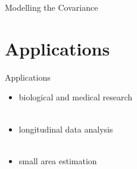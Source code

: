\documentclass[9pt, xelatex]{beamer}
\begin{document}
{\begin{frame}[allowframebreaks]{Modelling the Covariance}
%	
%	
	\end{frame}
}

\section{Applications}{
	\begin{frame}{Applications}
		\begin{itemize}
			\item biological and medical research \\ $\;$
			\item longitudinal data analysis \\ $\;$
			\item small area estimation
		\end{itemize}
	\end{frame}
}
\end{document}
